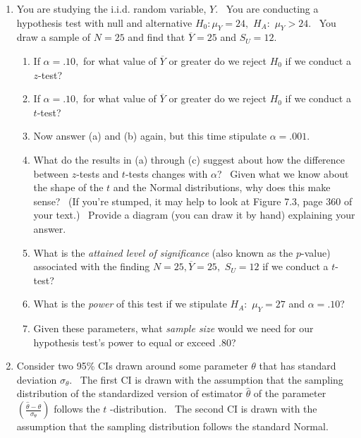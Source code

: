 \documentclass[11pt]{article}
\begin{document}
\begin{enumerate}
\item You are studying the i.i.d. random variable, $Y.$ \ You are conducting
a hypothesis test with null and alternative $H_{0}:\mu _{Y}=24,$ $H_{A}:$ $%
\mu _{Y}>24.$ \ You draw a sample of $N=25$ and find that $\overline{Y}=25$
and $S_{U}=12.$

\begin{enumerate}
\item If $\alpha =.10,$ for what value of $\overline{Y}$ or greater do we
reject $H_{0}$ if we conduct a $z$-test? \ 

\item If $\alpha =.10,$ for what value of $\overline{Y}$ or greater do we
reject $H_{0}$ if we conduct a $t$-test? \ 

\item Now answer (a) and (b) again, but this time stipulate $\alpha =.001.$

\item What do the results in (a) through (c) suggest about how the
difference between $z$-tests and $t$-tests changes with $\alpha $? \ Given
what we know about the shape of the $t$ and the Normal distributions, why
does this make sense? \ (If you're stumped, it may help to look at Figure
7.3, page 360 of your text.) \ Provide a diagram (you can draw it by hand)
explaining your answer. \ 

\item What is the \textit{attained level of significance }(also known as the 
$p$-value) associated with the finding $N=25,\overline{Y}=25,$ $S_{U}=12$ if
we conduct a $t$-test?

\item What is the \textit{power} of this test if we stipulate $H_{A}:$ $\mu
_{Y}=27$ and $\alpha =.10$?

\item Given these parameters, what \textit{sample size }would we need for
our hypothesis test's power to equal or exceed $.80$?\medskip 
\end{enumerate}

\item Consider two 95\% CIs drawn around some parameter $\theta $ that has
standard deviation $\sigma _{\theta }.$ \ The first CI is drawn with the
assumption that the sampling distribution of the standardized version of
estimator $\widehat{\theta }$ of the parameter $\left( \frac{\widehat{\theta 
}-\theta }{\sigma \widehat{_{\theta }}}\right) $ follows the $t$%
-distribution. \ The second CI is drawn with the assumption that the
sampling distribution follows the standard Normal. \ 


\end{enumerate}
\end{document}

